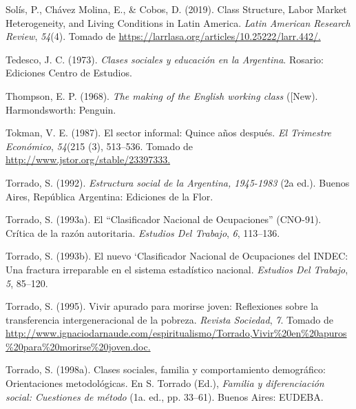 \documentclass[
]{article}
\newlength{\cslhangindent}
\newlength{\cslentryspacingunit} %
\newenvironment{CSLReferences}[2] %
 {%
  \setlength{\parindent}{0pt}
  \ifodd #1
  \let\oldpar\par
  \def\par{\hangindent=\cslhangindent\oldpar}
  \fi
  \setlength{\parskip}{#2\cslentryspacingunit}
 }%
 {}
\begin{document}
\begin{CSLReferences}{1}{0}
\leavevmode{}%
Solís, P., Chávez Molina, E., \& Cobos, D. (2019). Class {Structure}, {Labor} {Market} {Heterogeneity}, and {Living} {Conditions} in {Latin} {America}. \emph{Latin American Research Review}, \emph{54}(4). Tomado de \href{https://larrlasa.org/articles/10.25222/larr.442/}{https://larrlasa.org/articles/10.25222/larr.442/.}

\leavevmode{}%
Tedesco, J. C. (1973). \emph{Clases sociales y educación en la {Argentina}}. Rosario: Ediciones Centro de Estudios.

\leavevmode{}%
Thompson, E. P. (1968). \emph{The making of the {English} working class} ({[}New). Harmondsworth: Penguin.

\leavevmode{}%
Tokman, V. E. (1987). El sector informal: Quince años después. \emph{El Trimestre Económico}, \emph{54}(215 (3), 513--536. Tomado de \href{http://www.jstor.org/stable/23397333}{http://www.jstor.org/stable/23397333.}

\leavevmode{}%
Torrado, S. (1992). \emph{Estructura social de la {Argentina}, 1945-1983} (2a ed.). Buenos Aires, República Argentina: Ediciones de la Flor.

\leavevmode{}%
Torrado, S. (1993a). El {``{Clasificador} {Nacional} de {Ocupaciones}''} ({CNO}-91). {Crítica} de la razón autoritaria. \emph{Estudios Del Trabajo}, \emph{6}, 113--136.

\leavevmode{}%
Torrado, S. (1993b). El nuevo `{Clasificador} {Nacional} de {Ocupaciones} del {INDEC}: Una fractura irreparable en el sistema estadístico nacional. \emph{Estudios Del Trabajo}, \emph{5}, 85--120.

\leavevmode{}%
Torrado, S. (1995). Vivir apurado para morirse joven: Reflexiones sobre la transferencia intergeneracional de la pobreza. \emph{Revista Sociedad}, \emph{7}. Tomado de \href{http://www.ignaciodarnaude.com/espiritualismo/Torrado,Vivir\%20en\%20apuros\%20para\%20morirse\%20joven.doc}{http://www.ignaciodarnaude.com/espiritualismo/Torrado,Vivir\%20en\%20apuros\%20para\%20morirse\%20joven.doc.}

\leavevmode{}%
Torrado, S. (1998a). Clases sociales, familia y comportamiento demográfico: Orientaciones metodológicas. En S. Torrado (Ed.), \emph{Familia y diferenciación social: Cuestiones de método} (1a. ed., pp. 33--61). Buenos Aires: EUDEBA.


\end{CSLReferences}
\end{document}
